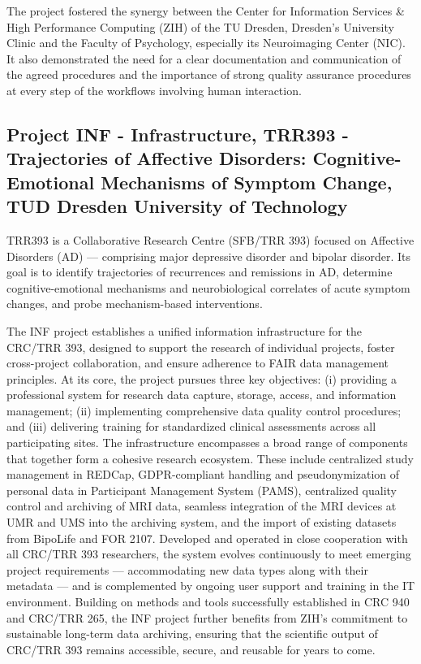 \documentclass{eceasst}
\begin{document}
The project fostered the synergy between the Center for Information Services \& High Performance Computing (ZIH) of the TU Dresden, Dresden's University Clinic and the Faculty of Psychology, especially its Neuroimaging Center (NIC). It also demonstrated the need for a clear documentation and communication of the agreed procedures and the importance of strong quality assurance procedures at every step of the workflows involving human interaction.


\subsection{Project INF - Infrastructure, TRR393 - Trajectories of Affective Disorders: Cognitive-Emotional Mechanisms of Symptom Change, TUD Dresden University of Technology}

TRR393 is a Collaborative Research Centre (SFB/TRR 393) focused on Affective Disorders (AD) — comprising major depressive disorder and bipolar disorder. Its goal is to identify trajectories of recurrences and remissions in AD, determine cognitive-emotional mechanisms and neurobiological correlates of acute symptom changes, and probe mechanism-based interventions.

The INF project establishes a unified information infrastructure for the CRC/TRR 393, designed to support the research of individual projects, foster cross-project collaboration, and ensure adherence to FAIR data management principles. At its core, the project pursues three key objectives: (i) providing a professional system for research data capture, storage, access, and information management; (ii) implementing comprehensive data quality control procedures; and (iii) delivering training for standardized clinical assessments across all participating sites.
The infrastructure encompasses a broad range of components that together form a cohesive research ecosystem. These include centralized study management in REDCap, GDPR-compliant handling and pseudonymization of personal data in Participant Management System (PAMS), centralized quality control and archiving of MRI data, seamless integration of the MRI devices at UMR and UMS into the archiving system, and the import of existing datasets from BipoLife and FOR 2107. Developed and operated in close cooperation with all CRC/TRR 393 researchers, the system evolves continuously to meet emerging project requirements — accommodating new data types along with their metadata — and is complemented by ongoing user support and training in the IT environment.
Building on methods and tools successfully established in CRC 940 and CRC/TRR 265, the INF project further benefits from ZIH's commitment to sustainable long-term data archiving, ensuring that the scientific output of CRC/TRR 393 remains accessible, secure, and reusable for years to come.
\end{document}
